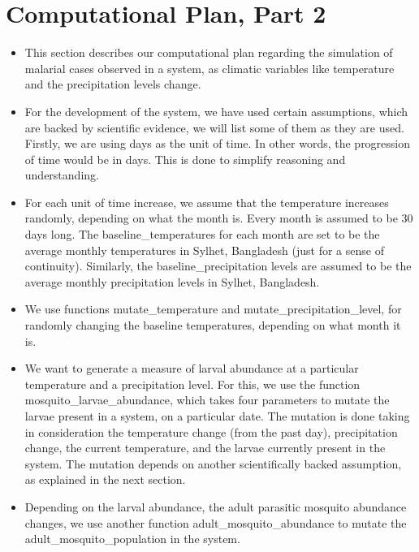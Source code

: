 \documentclass[fontsize=11pt]{article}
\begin{document}
    \section*{Computational Plan, Part 2}
    \begin{itemize}
        \item \large This section describes our computational plan regarding the simulation of malarial cases observed in a system, as climatic variables like temperature and the precipitation levels change.

        \item For the development of the system, we have used certain assumptions, which are backed by scientific evidence, we will list some of them as they are used. Firstly, we are using days as the unit of time. In other words, the progression of time would be in days. This is done to simplify reasoning and understanding.

        \item For each unit of time increase, we assume that the temperature increases randomly, depending on what the month is. Every month is assumed to be 30 days long.
        The baseline\_temperatures for each month are set to be the average monthly temperatures in Sylhet, Bangladesh (just for a sense of continuity). Similarly, the baseline\_precipitation levels are assumed to be the average monthly precipitation levels in Sylhet, Bangladesh.

        \item We use functions mutate\_temperature and mutate\_precipitation\_level, for randomly changing the baseline temperatures, depending on what month it is.

        \item We want to generate a measure of larval abundance at a particular temperature and a precipitation level. For this, we use the function mosquito\_larvae\_abundance, which takes four parameters to mutate the larvae present in a system, on a particular date. The mutation is done taking in consideration the temperature change (from the past day), precipitation change, the current temperature, and the larvae currently present in the system. The mutation depends on another scientifically backed assumption, as explained in the next section.

        \item Depending on the larval abundance, the adult parasitic mosquito abundance changes, we use another function adult\_mosquito\_abundance to mutate the adult\_mosquito\_population in the system.


\end{itemize}
\end{document}
